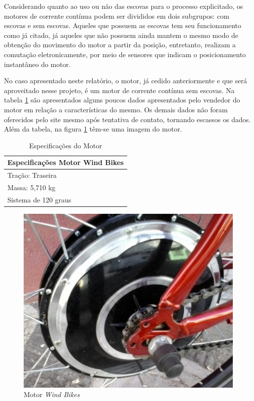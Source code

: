  Considerando quanto ao uso ou não das escovas para o processo explicitado, os motores de corrente contínua podem ser divididos em dois subgrupos: com escovas e sem escovas. Aqueles que possuem as escovas tem seu funcionamento como já citado, já aqueles que não possuem ainda mantem o mesmo modo de obtenção do movimento do motor a partir da posição, entretanto, realizam a comutação eletronicamente, por meio de sensores que indicam o posicionamento instantâneo do motor. 

No caso apresentado neste relatório, o motor, já cedido anteriormente e que será aproveitado nesse projeto, é um motor de corrente contínua sem escovas. Na tabela \ref{esp_motor} são apresentados alguns poucos dados apresentados pelo vendedor do motor em relação a características do mesmo. Os demais dados não foram oferecidos pelo site mesmo após tentativa de contato, tornando escassos os dados. Além da tabela, na figura \ref{img:motor} têm-se uma imagem do motor.

\begin{table}[h!]
\centering
\caption{Especificações do Motor}
\label{esp_motor}
\begin{tabular}{|l|}
\hline
Especificações Motor Wind Bikes \\ \hline
Tração: Traseira                \\ \hline
Massa: 5,710 kg                 \\ \hline
Sistema de 120 graus            \\ \hline
\end{tabular}
\end{table}

\graphicspath{{figuras/}}
\begin{figure}[h!]
\centering
\includegraphics[scale=0.80]{motor.png}
\caption{Motor \textit{Wind Bikes}}
\label{img:motor}
\end{figure}
	
